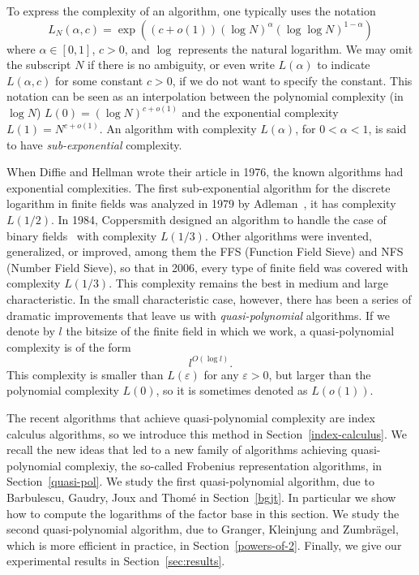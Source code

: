 \documentclass[a4paper,11pt]{article}
\theoremstyle{break}
\theoremstyle{sc}
\theoremstyle{definition}
\theoremstyle{remark}
\begin{document}
To express the complexity of an algorithm, one typically uses the notation
\[
  L_N(\alpha, c) = \exp((c+o(1))(\log N)^\alpha(\log\log N)^{1-\alpha})
\]
where $\alpha\in[0, 1]$, $c>0$, and $\log$ represents the natural logarithm. We may
omit the subscript $N$ if there is no ambiguity, or even write
$L(\alpha)$ to indicate $L(\alpha, c)$ for some constant $c>0$, if we do not
want to specify the constant. This notation can be seen as an interpolation
between the polynomial complexity (in $\log N$) $L(0)=(\log N)^{c+o(1)}$ and the exponential
complexity $L(1)=N^{c+o(1)}$. An algorithm with complexity $L(\alpha)$, for
$0<\alpha<1$, is said to have \emph{sub-exponential} complexity.

When Diffie and Hellman wrote their article in 1976, the known algorithms
had exponential complexities. The first sub-exponential algorithm for the
discrete logarithm in finite fields was analyzed
in 1979 by Adleman~\cite{Adleman79}, it has complexity $L(1/2)$. In 1984, 
Coppersmith designed
an algorithm to handle the case of binary fields~\cite{Coppersmith84} with 
complexity $L(1/3)$. Other
algorithms were invented, generalized, or improved, among them the FFS
(Function Field Sieve) and NFS (Number Field Sieve), so that in 2006, every type
of finite field was covered with complexity $L(1/3)$. This complexity remains
the best in medium and large characteristic. In the small
characteristic case, however, there has been a series of dramatic
improvements that leave us with \emph{quasi-polynomial} algorithms. If we denote
by $l$ the bitsize of the finite field in which we work, a quasi-polynomial
complexity is of the form
\[
  l^{O(\log l)}.
\]
This complexity is smaller than $L(\varepsilon)$ for any
$\varepsilon>0$, but larger than the polynomial complexity $L(0)$, so it
is sometimes denoted as $L(o(1))$.

The recent algorithms that achieve quasi-polynomial complexity are index
calculus algorithms, so we introduce this method in
Section~\ref{index-calculus}. We recall the new ideas that led to a new family
of algorithms achieving quasi-polynomial complexiy, the so-called Frobenius representation algorithms, in Section~\ref{quasi-pol}. We study the first quasi-polynomial algorithm, due to
Barbulescu, Gaudry, Joux and Thomé in Section~\ref{bgjt}. In particular we show
how to compute the logarithms of the factor base in this section. We study the
second quasi-polynomial algorithm, due to Granger, Kleinjung and Zumbrägel,
which is more efficient in practice, in Section~\ref{powers-of-2}. Finally, we
give our experimental results in Section~\ref{sec:results}.
\end{document}
